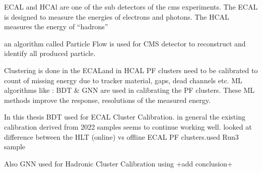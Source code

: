 
ECAL and  HCAl are one of the sub detectors of the cms experiments.
The ECAL is designed to measure the energies of electrons and photons.
The HCAL measures the energy of “hadrons”
    
an algorithm called Particle Flow is used for  CMS detector to reconstruct and identify all produced particle.

Clustering is done in the ECALand in HCAL
PF clusters need to be calibrated to count of missing energy due to tracker material, gaps, dead channels etc.
ML algorithms like : BDT & GNN are used in calibrating the PF clusters.
These ML methods improve the response, resolutions of the measured energy.
    
In this thesis BDT used for ECAL Cluster Calibration. in general the existing calibration derived from 2022 samples seems to continue working well.
looked at difference between the HLT (online) vs offline ECAL PF clusters.used Run3 sample
    
Also GNN used for Hadronic Cluster Calibration using +add conclusion+

